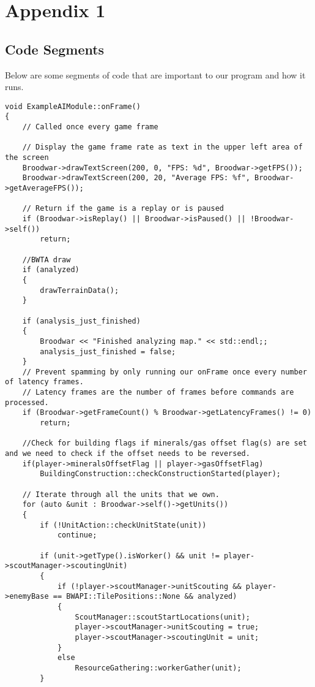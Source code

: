 \documentclass[10pt,letterpaper,onecolumn,draftclsnofoot]{IEEEtran}
\begin{document}
\section{Appendix 1}
\subsection{Code Segments}
Below are some segments of code that are important to our program and how it runs.

\begin{lstlisting}
void ExampleAIModule::onFrame()
{
	// Called once every game frame

	// Display the game frame rate as text in the upper left area of the screen
	Broodwar->drawTextScreen(200, 0, "FPS: %d", Broodwar->getFPS());
	Broodwar->drawTextScreen(200, 20, "Average FPS: %f", Broodwar->getAverageFPS());

	// Return if the game is a replay or is paused
	if (Broodwar->isReplay() || Broodwar->isPaused() || !Broodwar->self())
		return;

	//BWTA draw
	if (analyzed)
	{
		drawTerrainData();
	}

	if (analysis_just_finished)
	{
		Broodwar << "Finished analyzing map." << std::endl;;
		analysis_just_finished = false;
	}
	// Prevent spamming by only running our onFrame once every number of latency frames.
	// Latency frames are the number of frames before commands are processed.
	if (Broodwar->getFrameCount() % Broodwar->getLatencyFrames() != 0)
		return;

	//Check for building flags if minerals/gas offset flag(s) are set and we need to check if the offset needs to be reversed.
	if(player->mineralsOffsetFlag || player->gasOffsetFlag)
		BuildingConstruction::checkConstructionStarted(player);

	// Iterate through all the units that we own.
	for (auto &unit : Broodwar->self()->getUnits())
	{
		if (!UnitAction::checkUnitState(unit))
			continue;

		if (unit->getType().isWorker() && unit != player->scoutManager->scoutingUnit)
		{
			if (!player->scoutManager->unitScouting && player->enemyBase == BWAPI::TilePositions::None && analyzed)
			{
				ScoutManager::scoutStartLocations(unit);
				player->scoutManager->unitScouting = true;
				player->scoutManager->scoutingUnit = unit;
			}
			else
				ResourceGathering::workerGather(unit);
		}


\end{lstlisting}
\end{document}
